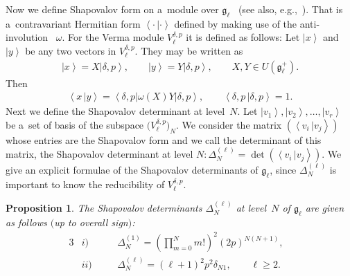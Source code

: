\documentclass[11pt]{article}
\numberwithin{equation}{section}
\newtheorem{proposition}{Proposition}
\def\bra#1{\left\langle #1\right|}
\def\ket#1{\left| #1\right\rangle}
\def\bracket#1#2{\left\langle #1  \,\right| \left. #2 \right\rangle}
\begin{document}
Now we def\/ine Shapovalov form on a~module over $ {\mathfrak g}_{\ell} $~\cite{Shapo} (see also, e.g.,~\cite{KacRai}).
That is a~contravariant Hermitian form $ \bracket{\cdot}{\cdot} $ def\/ined by making use of the anti-involution~ $\omega$.
For the Verma module $ V^{\delta,p}_{\ell} $ it is def\/ined as follows:   Let $ \ket{x} $ and $ \ket{y} $ be any two
vectors in $ V^{\delta,p}_{\ell}$.
They may be written as
\begin{gather*}
\ket{x} = X \ket{\delta,p},
\qquad
\ket{y} = Y \ket{\delta,p},
\qquad
X, Y \in U({\mathfrak g}_{\ell}^+).
\end{gather*}
Then
\begin{gather}
\bracket{x}{y} = \bra{\delta,p} \omega(X) Y \ket{\delta,p},
\qquad
\bracket{\delta,p}{\delta,p} = 1.
\label{innerprod-def}
\end{gather}
Next we def\/ine the Shapovalov determinant at level~$N$.
Let $ \ket{v_1}, \ket{v_2}, \dots, \ket{v_r} $ be a~set of basis of the subspace $ \big(V^{\delta,p}_{\ell}\big)_N$.
We consider the matrix $ (\bracket{v_i}{v_j}) $ whose entries are     the Shapovalov form and we call the determinant of
this matrix, the Shapovalov determinant at level $N: \Delta^{(\ell)}_N = \det (\bracket{v_i}{v_j})$.
We give an explicit formulae of the Shapovalov determinants of $ {\mathfrak g}_{\ell}$, since $ \Delta^{(\ell)}_N $ is
important to know the reducibility of $V^{\delta,p}_{\ell}$.
\begin{proposition}\label{prop1}
The Shapovalov determinants $ \Delta^{(\ell)}_N$ at level~$N$ of ${\mathfrak g}_{\ell}$ are given as follows $($up to
overall sign$)$:
\begin{alignat}{3}
   & i)
\quad &&
\Delta_N^{(1)} = \left(\prod\limits_{m=0}^N m! \right)^2 (2p)^{N(N+1)},&
\label{KDl1}
\\
  &   ii)
\quad &&
\Delta^{(\ell)}_N = (\ell+1)^2   p^2   \delta_{N1},
\qquad
\ell \geq 2.&
\end{alignat}
\end{proposition}
\end{document}
